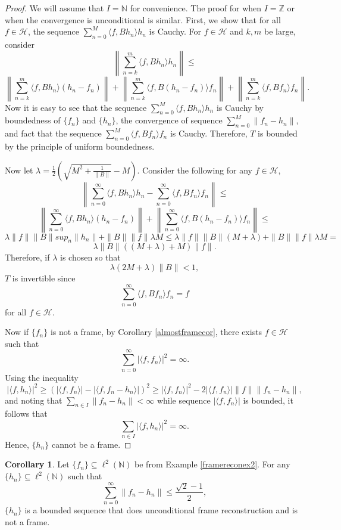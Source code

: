 \documentclass[11pt]{amsart}
\theoremstyle{definition}
\newtheorem{cor}{Corollary}[section]
\numberwithin{equation}{section}
\newcommand{\Hcal}{\mathcal{H}} %
\begin{document}
\begin{proof}
We will assume that $I=\mathbb{N}$ for convenience. The proof for when $I=\mathbb{Z}$ or when the convergence is unconditional is similar.
First, we show that for all $f\in \Hcal$, the sequence $\sum_{n=0}^{M}\langle f, Bh_{n}\rangle h_{n}$ is Cauchy.
For $f\in \Hcal$ and $k,m$ be large, consider
$$\left \|\sum_{n=k}^{m}\langle f, Bh_n\rangle h_n \right\| \leq$$
$$\left \|\sum_{n=k}^{m}\langle f, Bh_n\rangle (h_n-f_n) \right\|+\left\|\sum_{n=k}^{m}\langle f, B(h_n-f_n)\rangle f_n \right\|+ \left \|\sum_{n=k}^{m}\langle f, Bf_n\rangle f_n \right\|.$$
Now it is easy to see that the sequence $\sum_{n=0}^{M}\langle f, Bh_{n}\rangle h_{n}$ is Cauchy by boundedness of $\{f_n\}$ and $\{h_{n}\}$, the convergence of sequence $\sum_{n=0}^{M}\|f_{n}-h_{n}\|$, and fact that the sequence $\sum_{n=0}^{M}\langle f, Bf_{n}\rangle f_{n}$ is Cauchy. Therefore, $T$ is bounded by the principle of uniform boundedness.

Now let $\lambda=\frac{1}{2}\left(\sqrt{M^2 + \frac{1}{\|B\|}} - M \right)$. Consider the following for any $f\in \Hcal$,
$$\left\|\sum_{n=0}^{\infty}\langle f, Bh_{n}\rangle h_{n}-\sum_{n=0}^{\infty}\langle f, Bf_{n}\rangle f_{n} \right \| \leq$$
$$\left \|\sum_{n=0}^{\infty}\langle f, Bh_n\rangle (h_n-f_n)\right \|+ \left\|\sum_{n=0}^{\infty}\langle f, B(h_n-f_n)\rangle f_n\right\| \leq$$ $$\lambda \|f\| \|B\| sup_{n}\|h_n\|+ \|B\| \|f\| \lambda M \leq \lambda \|f\| \|B\| (M+\lambda)+\|B\| \|f\| \lambda M=$$
$$\lambda \|B\|((M+\lambda)+M)\|f\|.$$
Therefore, if $\lambda$ is chosen so that $$\lambda(2M+\lambda)\|B\|<1, $$ $T$ is invertible since 
$$\sum_{n=0}^{\infty}\langle f, Bf_{n}\rangle f_{n}=f$$ for all $f\in \Hcal$.

Now if \(\{f_n\}\) is not a frame, by Corollary \ref{almostframecor}, there exists \(f \in \mathcal{H}\) such that
\[
\sum_{n=0}^\infty |\langle f, f_n \rangle|^2 = \infty.
\]
Using the inequality
$$
|\langle f, h_n \rangle|^2 \geq (|\langle f,f_n\rangle|-|\langle f,f_n-h_n\rangle|)^{2}
\geq  |\langle f, f_n \rangle|^2 - 2|\langle f, f_n \rangle|\|f\| \|f_n-h_n\| ,
$$
and noting that \(\sum_{n\in I} \|f_n - h_n\| < \infty\) while sequence \(|\langle f, f_n \rangle|\) is bounded, it follows that
\[
\sum_{n\in I} |\langle f, h_n \rangle|^2 = \infty.
\]
Hence, \(\{h_n\}\) cannot be a frame.
\end{proof}

\begin{cor}
Let $\{f_{n}\}\subseteq \ell^{2}(\mathbb{N})$ be from Example \ref{framereconex2}. For any $\{h_{n}\}\subseteq \ell^{2}(\mathbb{N})$ such that
$$\sum_{n=0}^{\infty}\|f_n-h_n\|\leq \frac{\sqrt{2}-1}{2},$$ $\{h_{n}\}$ is a bounded sequence that does unconditional frame reconstruction and is not a frame.
\end{cor}
\end{document}
